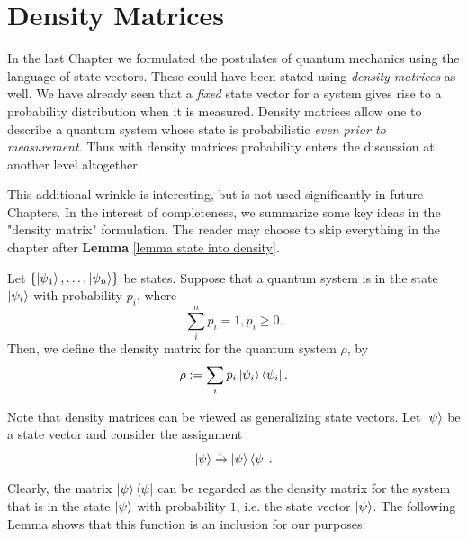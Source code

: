 
\chapter{Density Matrices} %

\label{Chapter4-density matrix} %

In the last Chapter we formulated the postulates of quantum mechanics using the language of state vectors. These could have been stated using \textit{density matrices} as well. We have already seen that a {\emph{fixed}} state vector for a system gives rise to a probability distribution when it is measured.  Density matrices allow one to describe a quantum system whose state is probabilistic {\emph{even prior to measurement}}.  Thus with density matrices probability enters the discussion at another level altogether.

This additional wrinkle is interesting, but is not used significantly in future Chapters.  In the interest of completeness, we summarize some key ideas in the "density matrix" formulation.  The reader may choose to skip everything in the chapter after {\bf{Lemma}} \ref{lemma state into density}.

\begin{definition}
Let $\{\ket{\psi_1},\hdots,\ket{\psi_n}\}$ be states.  Suppose that a quantum system is in the state $\ket{\psi_i}$ with probability $p_i$, where  
\begin{equation}
\sum\limits_i^n p_i=1, p_i \geq 0.
\end{equation}
Then, we define the density matrix for the quantum system $\rho$, by 
\begin{equation}
    \rho:=\sum_i p_i \ket{\psi_i}\bra{\psi_i}.
\end{equation}
\end{definition}

Note that density matrices can be viewed as generalizing state vectors.  Let $\ket{\psi}$ be a state vector and consider the assignment
$$\ket{\psi} \xrightarrow{\iota} \ket{\psi}\bra{\psi}.$$

Clearly, the matrix $\ket{\psi}\bra{\psi}$ can be regarded as the density matrix for the system that is in the state $\ket{\psi}$ with probability $1$, i.e. the state vector $\ket{\psi}$.  The following Lemma shows that this function is an inclusion for our purposes.

